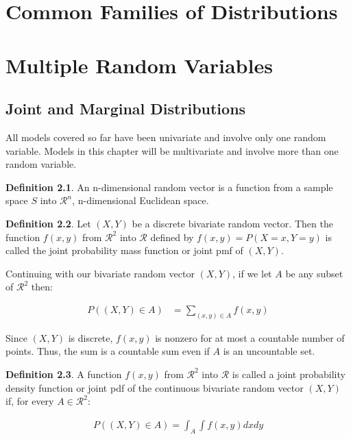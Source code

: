\documentclass[11pt,a4paper]{report}
\theoremstyle{definition}
\newtheorem{defn}{Definition}[section]
\theoremstyle{theorem}
\begin{document}
\chapter{Common Families of Distributions}

\chapter{Multiple Random Variables}

\section{Joint and Marginal Distributions}

All models covered so far have been univariate and involve only one random variable.  Models in this chapter will be multivariate and involve more than one random variable.

\begin{defn}
An n-dimensional random vector is a function from a sample space $S$ into $\mathcal{R}^n$, n-dimensional Euclidean space.  
\end{defn}

\begin{defn}
Let $(X,Y)$ be a discrete bivariate random vector.  Then the function $f(x,y)$ from $\mathcal{R}^2$ into $\mathcal{R}$ defined by $f(x,y) = P(X = x, Y = y)$ is called the joint probability mass function or joint pmf of $(X,Y)$.
\end{defn}

Continuing with our bivariate random vector $(X,Y)$, if we let $A$ be any subset of $\mathcal{R}^2$ then:

\begin{align*}
  P((X,Y) \in A) &= \sum_{(x,y) \in A} f(x,y)
\end{align*}

Since $(X,Y)$ is discrete, $f(x,y)$ is nonzero for at most a countable  number of points.  Thus, the sum is a countable sum even if $A$ is an uncountable set.

\begin{defn}
  A function $f(x,y)$ from $\mathcal{R}^2$ into $\mathcal{R}$ is called a joint probability density function or joint pdf of the continuous bivariate random vector $(X,Y)$ if, for every $A \in \mathcal{R}^2$:

  \begin{align*}
    P((X,Y) \in A) = \int_A \int f(x,y) dx dy
  \end{align*}
\end{defn}
\end{document}

